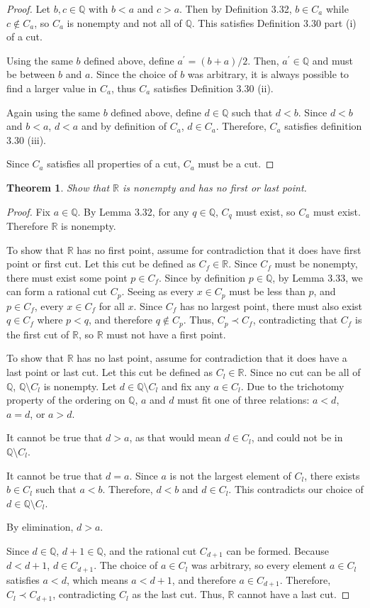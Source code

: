 \documentclass{amsart}
\newtheorem{theorem}{Theorem}
\newcommand{\Q}{\mathbb Q}
\newcommand{\R}{\mathbb R}
\newcommand{\1}{\mathds{1}}
\def \R {{\mathbb {R}}}
\numberwithin{equation}{section}
\numberwithin{theorem}{section}
\begin{document}
\begin{proof}
	Let $b,c\in\Q$ with $b<a$ and $c>a$. Then by Definition 3.32, $b\in C_a$ while $c\notin C_a$, so $C_a$ is nonempty and not all of $\Q$. This satisfies Definition 3.30 part (i) of a cut.
	
	Using the same $b$ defined above, define $a^\prime = (b+a)/2$. Then, $a^\prime\in\Q$ and must be between $b$ and $a$. Since the choice of $b$ was arbitrary, it is always possible to find a larger value in $C_a$, thus $C_a$ satisfies Definition 3.30 (ii).
	
	Again using the same $b$ defined above, define $d\in\Q$ such that $d<b$. Since $d<b$ and $b<a$, $d<a$ and by definition of $C_a$, $d\in C_a$. Therefore, $C_a$ satisfies definition 3.30 (iii).
	
	Since $C_a$ satisfies all properties of a cut, $C_a$ must be a cut. 
\end{proof}


\begin{theorem}
	Show that $\R$ is nonempty and has no first or last point.
\end{theorem}

\begin{proof}
	Fix $a\in\Q$. By Lemma 3.32, for any $q\in\Q$, $C_q$ must exist, so $C_a$ must exist. Therefore $\R$ is nonempty.
	
	To show that $\R$ has no first point, assume for contradiction that it does have first point or first cut. Let this cut be defined as $C_f\in\R$. Since $C_f$ must be nonempty, there must exist some point $p\in C_f$. Since by definition $p\in \Q$, by Lemma 3.33, we can form a rational cut $C_p$. Seeing as every $x\in C_p$ must be less than $p$, and $p\in C_f$, every $x\in C_f$ for all $x$. Since $C_f$ has no largest point, there must also exist $q\in C_f$ where $p<q$, and therefore $q\notin C_p$. Thus, $C_p \prec C_f$, contradicting that $C_f$ is the first cut of $\R$, so $\R$ must not have a first point.
	
	To show that $\R$ has no last point, assume for contradiction that it does have a last point or last cut. Let this cut be defined as $C_l\in\R$. Since no cut can be all of $\Q$, $\Q\setminus C_l$ is nonempty. Let $d\in \Q\setminus C_l$ and fix any $a\in C_l$. Due to the trichotomy property of the ordering on $\Q$, $a$ and $d$ must fit one of three relations: $a<d$, $a=d$, or $a>d$.
	
	It cannot be true that $d>a$, as that would mean $d\in C_l$, and could not be in $\Q\setminus C_l$. 
	
	It cannot be true that $d=a$. Since $a$ is not the largest element of $C_l$, there exists $b\in C_l$ such that $a<b$. Therefore, $d<b$ and $d\in C_l$. This contradicts our choice of $d\in\Q\setminus C_l$.
	
	By elimination, $d>a$.
	
	Since $d\in \Q$, $d+1\in\Q$, and the rational cut $C_{d+1}$ can be formed. Because $d<d+1$, $d\in C_{d+1}$. The choice of $a\in C_l$ was arbitrary, so every element $a\in C_l$ satisfies $a<d$, which means $a<d+1$, and therefore $a\in C_{d+1}$. Therefore, $C_l\prec C_{d+1}$, contradicting $C_l$ as the last cut. Thus, $\R$ cannot have a last cut.
\end{proof}
\end{document}
